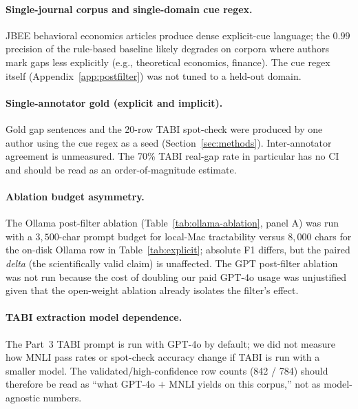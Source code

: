 \documentclass{article}
\begin{document}
\paragraph{Single-journal corpus and single-domain cue regex.} JBEE behavioral economics articles produce dense explicit-cue language; the $0.99$ precision of the rule-based baseline likely degrades on corpora where authors mark gaps less explicitly (e.g., theoretical economics, finance). The cue regex itself (Appendix~\ref{app:postfilter}) was not tuned to a held-out domain.

\paragraph{Single-annotator gold (explicit and implicit).} Gold gap sentences and the 20-row TABI spot-check were produced by one author using the cue regex as a seed (Section~\ref{sec:methods}). Inter-annotator agreement is unmeasured. The 70\% TABI real-gap rate in particular has no CI and should be read as an order-of-magnitude estimate.

\paragraph{Ablation budget asymmetry.} The Ollama post-filter ablation (Table~\ref{tab:ollama-ablation}, panel A) was run with a $3{,}500$-char prompt budget for local-Mac tractability versus $8{,}000$ chars for the on-disk Ollama row in Table~\ref{tab:explicit}; absolute F1 differs, but the paired \emph{delta} (the scientifically valid claim) is unaffected. The GPT post-filter ablation was not run because the cost of doubling our paid GPT-4o usage was unjustified given that the open-weight ablation already isolates the filter's effect.

\paragraph{TABI extraction model dependence.} The Part~3 TABI prompt is run with GPT-4o by default; we did not measure how MNLI pass rates or spot-check accuracy change if TABI is run with a smaller model. The validated/high-confidence row counts (842 / 784) should therefore be read as ``what GPT-4o $+$ MNLI yields on this corpus,'' not as model-agnostic numbers.
\end{document}
